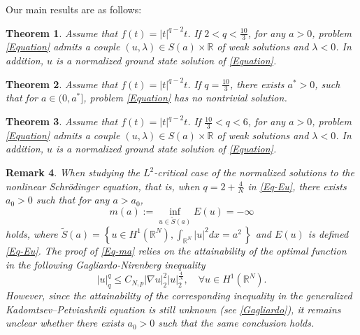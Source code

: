 \documentclass[11pt]{amsart}
\newtheorem{theorem}{Theorem}[section]
\newtheorem{remark}[theorem]{Remark}
\numberwithin{equation}{section}
\newcommand\R{\mathbb R}
\begin{document}
{{{Our main results are as follows:}
\begin{theorem}\label{Th1}
    Assume that $ f(t)=|t|^{q-2}t $. If $2<q<\frac{10}{3}$, for any $a>0$, problem \eqref{Equation} admits a couple $\left({u}, \lambda\right) \in S(a) \times \R$ of weak solutions and $\lambda<0$. {In addition, ${u}$ is a normalized ground state solution of \eqref{Equation}}.
\end{theorem}
{\begin{theorem}\label{Th-1}
        Assume that $ f(t)=|t|^{q-2}t $. If $q=\frac{10}{3}$, there exists $a^*>0$,
        such that for $a\in(0,a^*]$, problem \eqref{Equation} has no nontrivial solution.
\end{theorem}}

\begin{theorem}\label{Th2}
    Assume that $ f(t)=|t|^{q-2}t $. If $\frac{10}{3}<q<6$, for any $a>0$, problem \eqref{Equation} admits a couple $\left({u}, \lambda\right) \in S(a) \times \R$ of weak solutions and $\lambda<0$. In addition, ${u}$ is a normalized ground state solution of \eqref{Equation}.
\end{theorem}

{\begin{remark}
When studying the $L^2$-critical case of the normalized solutions to the nonlinear Schr\"{o}dinger equation, that is, when \( q = 2 + \frac{4}{N} \) in \eqref{Eq-Eu}, there exists \( a_0 > 0 \) such that for any \( a > a_0 \),
\begin{equation}\label{Eq-ma}
    m(a):=\inf _{u \in \tilde{S}(a)} E(u)=-\infty
\end{equation}
 holds, where $\tilde{S}(a)=\left\{u\in H^1(\mathbb{R}^N),   \int_{\mathbb{R}^{N}}|u|^{2}dx=a^{2}\, \right\}$ and $ E(u) $ is defined \eqref{Eq-Eu}.
  The proof of \eqref{Eq-ma} relies on the attainability of the optimal function in the following Gagliardo-Nirenberg inequality
 {  \begin{equation}\label{Eq-GN inequality}
    |u|_q^q \leq {C}_{N, p}|\nabla u|_2^{2}|u|_2^{\frac{4}{N}}, \quad \forall u \in H^1(\mathbb{R}^N).
  \end{equation}}
However, since the attainability of the corresponding inequality in the generalized Kadomtsev--Petviashvili equation is still unknown (see \eqref{Gagliardo}), it remains unclear whether there exists \( a_0 > 0 \) such that the same conclusion holds.
\end{remark}
}

}}
\end{document}
